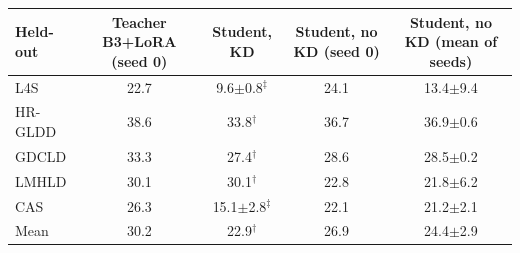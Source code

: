 \begin{tabular}{lcccc}
\toprule
Held-out & Teacher B3+LoRA (seed 0) & Student, KD & Student, no KD (seed 0) & Student, no KD (mean of seeds) \\
\midrule
L4S & 22.7 & 9.6$\pm$0.8$^\ddagger$ & 24.1 & 13.4$\pm$9.4 \\
HR-GLDD & 38.6 & 33.8$^\dagger$ & 36.7 & 36.9$\pm$0.6 \\
GDCLD & 33.3 & 27.4$^\dagger$ & 28.6 & 28.5$\pm$0.2 \\
LMHLD & 30.1 & 30.1$^\dagger$ & 22.8 & 21.8$\pm$6.2 \\
CAS & 26.3 & 15.1$\pm$2.8$^\ddagger$ & 22.1 & 21.2$\pm$2.1 \\
\midrule
Mean & 30.2 & 22.9$^\dagger$ & 26.9 & 24.4$\pm$2.9 \\
\bottomrule
\end{tabular}
